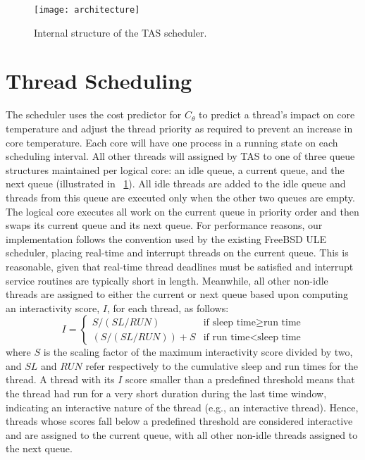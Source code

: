 \begin{figure}[t]
  \centering
  \texttt{[image: architecture]}
  \caption{Internal structure of the TAS scheduler.}
  \label{fig:tasque}
\end{figure}
\section{Thread Scheduling}
\label{sec:selection} 
The scheduler uses the cost predictor for $C_{\theta}$ to predict a
thread's impact on core temperature and adjust the thread priority as
required to prevent an increase in core temperature. Each core will have
one process in a running state on each scheduling interval. All other
threads will assigned by TAS to one of three queue structures maintained
per logical core: an idle queue, a current queue, and the next queue
(illustrated in \figurename~\ref{fig:tasque}).  All idle threads are
added to the idle queue and threads from this queue are executed only when
the other two queues are empty.  The logical core executes all work on
the current queue in priority order and then swaps its current queue and
its next queue. For performance reasons, our implementation follows the
convention used by the existing FreeBSD ULE scheduler, placing real-time
and interrupt threads on the current queue.  This is reasonable,
given that real-time thread deadlines must be satisfied and
interrupt service routines are typically short in length.
Meanwhile, all other non-idle threads are assigned to either the current or next
queue based upon computing an interactivity score, $I$, for each thread, as follows:
\begin{equation}
\label{eq:interactsleeprun} 
I =   
\begin{cases}
  S / (SL/RUN) & \text{if sleep time} \geq \text{run time}\\
  (S/ (SL / RUN))+S & \text{if run time} < \text{sleep time}
\end{cases}
\end{equation}
where $S$ is the scaling factor of the
maximum interactivity score divided by two, and $SL$ and $RUN$ refer
respectively to the cumulative sleep and run times for the thread.
A thread with its $I$ score smaller than a predefined threshold means that
the thread had run for a very short duration during the last time window,
indicating an interactive nature of the thread (e.g., an interactive thread).   
Hence, threads whose scores fall below a predefined threshold are considered
interactive and are assigned to the current queue, with all other non-idle
threads assigned to the next queue.

